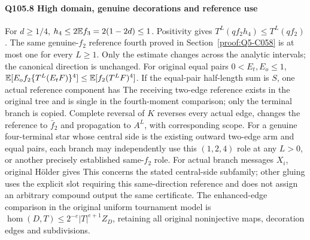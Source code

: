 \paragraph{Q105.8 High domain, genuine decorations and reference use}\label{part:Q105.8}
For $d\ge\allowbreak 1/4$, $h_4\le\allowbreak 2\mathbb E f_3=\allowbreak 2(1-2d)\le\allowbreak 1$.
Positivity gives $T^L(qf_2h_4)\le\allowbreak  T^L(qf_2)$.
The same genuine-$f_2$ reference fourth proved in
Section~\ref{proof:Q5-C058} is at most one for every $L\ge\allowbreak 1$.
Only the estimate changes across the analytic intervals; the canonical
direction is unchanged.
For original equal pairs $0<\allowbreak E_t,\allowbreak E_o\le\allowbreak 1$,
$\mathbb E[E_of_2\{T^L(E_tF)\}^4]\le\allowbreak \mathbb E[f_2(T^LF)^4]$.
If the equal-pair half-length sum is $S$, one actual reference component has
The receiving two-edge reference exists in the original tree and is
single in the fourth-moment comparison; only the terminal branch is copied.
Complete reversal of $K$ reverses every actual edge, changes the reference
to $\bar f_2$ and propagation to $A^L$, with corresponding scope.
For a genuine four-terminal star whose central side is the existing outward
two-edge arm and equal pairs, each branch may independently use this
$(1,\allowbreak 2,\allowbreak 4)$ role at any $L>\allowbreak 0$, or another precisely established same-$f_2$
role. For actual branch messages $X_i$, original H\"older gives
This concerns the stated central-side subfamily; other gluing uses the
explicit slot requiring this same-direction reference and does not assign
an arbitrary compound output the same certificate.
The enhanced-edge comparison in the original uniform tournament model is
$\operatorname{hom}(D,\allowbreak T)\le\allowbreak 2^{-e}|T|^{e+1}Z_D$, retaining all original
noninjective maps, decoration edges and subdivisions.
